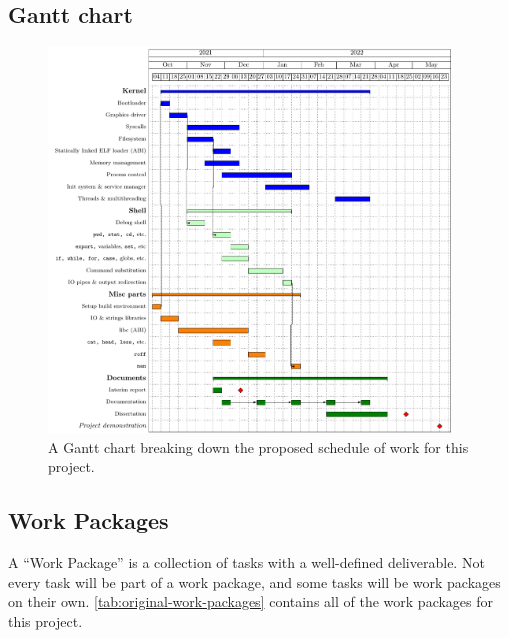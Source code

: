 \documentclass{article}
\begin{document}
\subsection{Gantt chart}
\begin{figure}[H]
    \includegraphics[width=0.95\textwidth]{build/original-gantt.pdf}
    \caption{A Gantt chart breaking down the proposed schedule of work for this
    project.}
    \label{fig:original-gantt-chart}
\end{figure}

\subsection{Work Packages}
A ``Work Package'' is a collection of tasks with a well-defined deliverable.
Not every task will be part of a work package, and some tasks will be work
packages on their own. \autoref{tab:original-work-packages} contains all of the
work packages for this project.
\end{document}

